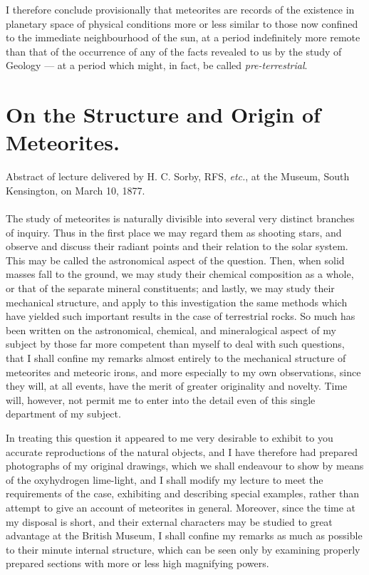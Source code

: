 \documentclass[a4paper, 12pt, oneside]{article}
\begin{document}
I therefore conclude provisionally that meteorites are records of the existence in planetary space of physical conditions more or less similar to those now confined to the immediate neighbourhood of the sun, at a period indefinitely more remote than that of the occurrence of any of the facts revealed to us by the study of Geology --- at a period which might, in fact, be called \emph{pre-terrestrial}.
\clearpage
\section{On the Structure and Origin of Meteorites.}
\begin{center}
Abstract of lecture delivered by H. C. Sorby, RFS, \emph{etc.}, at the Museum, South Kensington, on March 10, 1877.
\end{center}
\paragraph{}
The study of meteorites is naturally divisible into several very distinct branches of inquiry. Thus in the first place we may regard them as shooting stars, and observe and discuss their radiant points and their relation to the solar system. This may be called the astronomical aspect of the question. Then, when solid masses fall to the ground, we may study their chemical composition as a whole, or that of the separate mineral constituents; and lastly, we may study their mechanical structure, and apply to this investigation the same methods which have yielded such important results in the case of terrestrial rocks. So much has been written on the astronomical, chemical, and mineralogical aspect of my subject by those far more competent than myself to deal with such questions, that I shall confine my remarks almost entirely to the mechanical structure of meteorites and meteoric irons, and more especially to my own observations, since they will, at all events, have the merit of greater originality and novelty. Time will, however, not permit me to enter into the detail even of this single department of my subject.

In treating this question it appeared to me very desirable to exhibit to you accurate reproductions of the natural objects, and I have therefore had prepared photographs of my original drawings, which we shall endeavour to show by means of the oxyhydrogen lime-light, and I shall modify my lecture to meet the requirements of the case, exhibiting and describing special examples, rather than attempt to give an account of meteorites in general. Moreover, since the time at my disposal is short, and their external characters may be studied to great advantage at the British Museum, I shall confine my remarks as much as possible to their minute internal structure, which can be seen only by examining properly prepared sections with more or less high magnifying powers.
\end{document}
